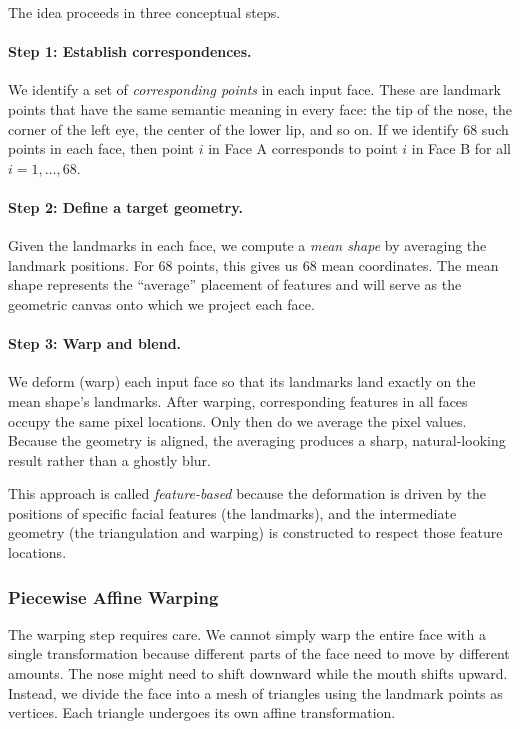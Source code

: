 The idea proceeds in three conceptual steps.

\paragraph{Step 1: Establish correspondences.}
We identify a set of \emph{corresponding points} in each input face. These are landmark points
that have the same semantic meaning in every face: the tip of the nose, the corner of the left
eye, the center of the lower lip, and so on. If we identify 68 such points in each face, then
point $i$ in Face A corresponds to point $i$ in Face B for all $i = 1, \dots, 68$.

\paragraph{Step 2: Define a target geometry.}
Given the landmarks in each face, we compute a \emph{mean shape} by averaging the landmark
positions. For 68 points, this gives us 68 mean coordinates. The mean shape represents the
``average'' placement of features and will serve as the geometric canvas onto which we project
each face.

\paragraph{Step 3: Warp and blend.}
We deform (warp) each input face so that its landmarks land exactly on the mean shape's
landmarks. After warping, corresponding features in all faces occupy the same pixel locations.
Only then do we average the pixel values. Because the geometry is aligned, the averaging produces
a sharp, natural-looking result rather than a ghostly blur.

This approach is called \emph{feature-based} because the deformation is driven by the positions
of specific facial features (the landmarks), and the intermediate geometry (the triangulation and
warping) is constructed to respect those feature locations.

\subsubsection{Piecewise Affine Warping}

The warping step requires care. We cannot simply warp the entire face with a single transformation
because different parts of the face need to move by different amounts. The nose might need to
shift downward while the mouth shifts upward. Instead, we divide the face into a mesh of triangles
using the landmark points as vertices. Each triangle undergoes its own affine transformation.

